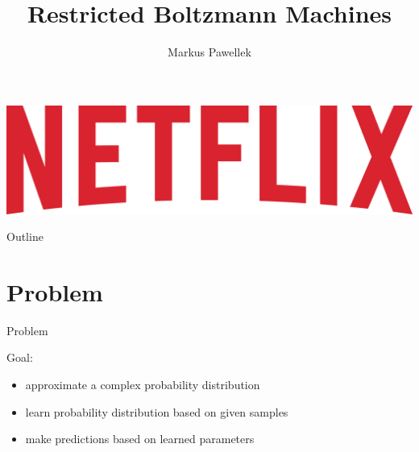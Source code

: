 \documentclass[aspectratio=169]{beamer}
\title{Restricted Boltzmann Machines}
\author{Markus Pawellek}
\begin{document}
  \renewcommand{\separate}{\qquad}

  \begin{frame}
    \vfill
    \includegraphics[width=\textwidth]{images/netflix-logo.jpg}
    \vfill
  \end{frame}

  \frame{\titlepage}
  \begin{frame}{Outline}
    \footnotesize
    \hfill\parbox[t][7cm][l]{0.9\textwidth}{\tableofcontents}
  \end{frame}

  \section{Problem} %
  \label{sec:Problem}
    \begin{frame}{Problem}

      Goal:
      \begin{itemize}
        \pause
        \item approximate a complex probability distribution
        \pause
        \item learn probability distribution based on given samples
        \pause
        \item make predictions based on learned parameters
      \end{itemize}
    \end{frame}
\end{document}
